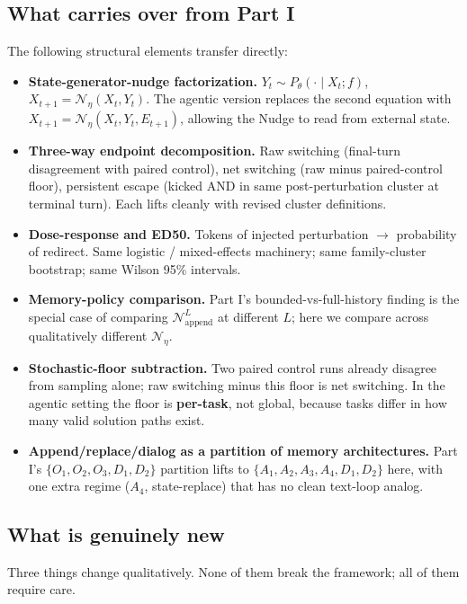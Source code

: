 \documentclass{article}
\theoremstyle{plain}
\theoremstyle{definition}
\begin{document}
\subsection{What carries over from Part I}

The following structural elements transfer directly:

\begin{itemize}
  \item \textbf{State-generator-nudge factorization.} $Y_t \sim P_\theta(\cdot \mid X_t; f)$, $X_{t+1} = \mathcal{N}_\eta(X_t, Y_t)$. The agentic version replaces the second equation with $X_{t+1} = \mathcal{N}_\eta(X_t, Y_t, E_{t+1})$, allowing the Nudge to read from external state.
  \item \textbf{Three-way endpoint decomposition.} Raw switching (final-turn disagreement with paired control), net switching (raw minus paired-control floor), persistent escape (kicked AND in same post-perturbation cluster at terminal turn). Each lifts cleanly with revised cluster definitions.
  \item \textbf{Dose-response and ED50.} Tokens of injected perturbation $\to$ probability of redirect. Same logistic / mixed-effects machinery; same family-cluster bootstrap; same Wilson 95\% intervals.
  \item \textbf{Memory-policy comparison.} Part I's bounded-vs-full-history finding is the special case of comparing $\mathcal{N}_\text{append}^L$ at different $L$; here we compare across qualitatively different $\mathcal{N}_\eta$.
  \item \textbf{Stochastic-floor subtraction.} Two paired control runs already disagree from sampling alone; raw switching minus this floor is net switching. In the agentic setting the floor is \textbf{per-task}, not global, because tasks differ in how many valid solution paths exist.
  \item \textbf{Append/replace/dialog as a partition of memory architectures.} Part I's $\{O_1, O_2, O_3, D_1, D_2\}$ partition lifts to $\{A_1, A_2, A_3, A_4, D_1, D_2\}$ here, with one extra regime ($A_4$, state-replace) that has no clean text-loop analog.
\end{itemize}

\subsection{What is genuinely new}

Three things change qualitatively. None of them break the framework; all of them require care.
\end{document}
